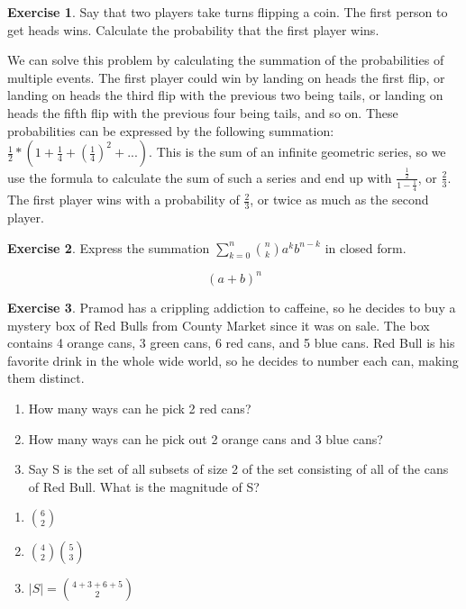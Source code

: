 \documentclass[12pt]{amsart}
\theoremstyle{definition}
\newtheorem{exercise}{Exercise}
\numberwithin{equation}{section}
\theoremstyle{plain}
\begin{document}
 

\begin{exercise}
Say that two players take turns flipping a coin. The first person to get heads wins. Calculate the probability that the first player wins.
\begin{answer}
    We can solve this problem by calculating the summation of the probabilities of multiple events. The first player could win by landing on heads the first flip, or landing on heads the third flip with the previous two being tails, or landing on heads the fifth flip with the previous four being tails, and so on. These probabilities can be expressed by the following summation: $\frac{1}{2}*(1+\frac{1}{4}+(\frac{1}{4})^2+...)$. This is the sum of an infinite geometric series, so we use the formula to calculate the sum of such a series and end up with $\frac{\frac{1}{2}}{1-\frac{1}{4}}$, or $\frac{2}{3}$. The first player wins with a probability of $\frac{2}{3}$, or twice as much as the second player.
\end{answer}
\end{exercise}

 

\begin{exercise}
Express the summation $\sum_{k=0}^{n}\binom{n}{k}a^kb^{n-k}$ in closed form.
\begin{answer}
\[
(a + b)^n
\]
\end{answer}
\end{exercise}

 

\begin{exercise}
Pramod has a crippling addiction to caffeine, so he decides to buy a mystery box of Red Bulls from County Market since it was on sale. The box contains 4 orange cans, 3 green cans, 6 red cans, and 5 blue cans. Red Bull is his favorite drink in the whole wide world, so he decides to number each can, making them distinct. 
\begin{enumerate}
\item How many ways can he pick 2 red cans?
\item How many ways can he pick out 2 orange cans and 3 blue cans?
\item Say S is the set of all subsets of size 2 of the set consisting of all of the cans of Red Bull. What is the magnitude of S?
\end{enumerate}
\begin{answer}
    \begin{enumerate}
        \item $\binom{6}{2}$
        \item $\binom{4}{2}\binom{5}{3}$
        \item $|S| = \binom{4 + 3 + 6 + 5}{2}$
    \end{enumerate}
\end{answer}
\end{exercise}
\end{document}
